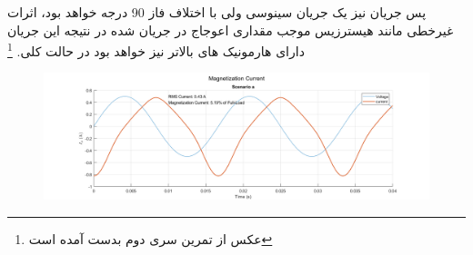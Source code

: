 \documentclass[11pt]{article}
\begin{document}
پس جریان نیز یک جریان سینوسی ولی با اختلاف فاز 90 درجه خواهد بود، اثرات غیرخطی مانند هیسترزیس موجب مقداری اعوجاج 
در جریان شده در نتیجه این جریان دارای هارمونیک های بالاتر نیز خواهد بود در حالت کلی.
\footnote{عکس از تمرین سری دوم بدست آمده است}

\begin{figure}[h!]
	\centering
	\includegraphics*[width=0.8\linewidth]{result/res2.png}
\end{figure}

\end{document}
